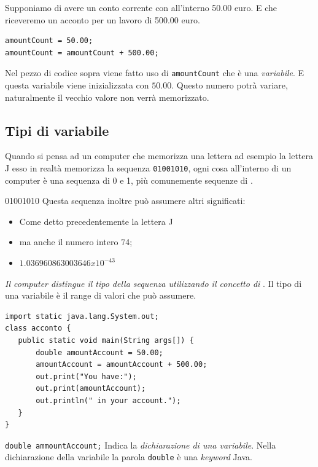 \begin{frame}[fragile]
\begin{block}{}
Supponiamo di avere un conto corrente con all'interno 50.00 euro. E che riceveremo un acconto per un lavoro di 500.00 euro.
\end{block}
\pause
\begin{lstlisting}
amountCount = 50.00;
amountCount = amountCount + 500.00;
\end{lstlisting}
\begin{block}{}
Nel pezzo di codice sopra viene fatto uso di \texttt{amountCount} che è una \textit{variabile}. E questa variabile viene
inizializzata con $50.00$. Questo numero potrà variare, naturalmente il vecchio valore non verrà memorizzato.
\end{block}
\end{frame}

\subsection*{Tipi di variabile}
\begin{frame}
\begin{block}{}
Quando si pensa ad un computer che memorizza una lettera ad esempio la lettera J esso in realtà memorizza la sequenza 
\texttt{01001010}, ogni cosa all'interno di un computer è una sequenza di 0 e 1, più comunemente sequenze di .
\end{block}
\begin{block}{01001010}
Questa sequenza inoltre può assumere altri significati:
\begin{itemize}
\item Come detto precedentemente la lettera J
\item ma anche il numero intero 74;
\item $1.036960863003646 x 10^{-43}$
\end{itemize}
\end{block}
\begin{block}{}
\textit{Il computer distingue il tipo della sequenza utilizzando il concetto di }. Il tipo di una variabile è
il range di valori che può assumere.
\end{block}
\end{frame}

\begin{frame}[fragile]
\begin{lstlisting}
import static java.lang.System.out;
class acconto {
   public static void main(String args[]) {
       double amountAccount = 50.00;
       amountAccount = amountAccount + 500.00;
       out.print("You have:");
       out.print(amountAccount);
       out.println(" in your account.");
   }	
}
\end{lstlisting}
\begin{block}{}
\texttt{double ammountAccount;}
Indica la \textit{dichiarazione di una variabile}. Nella dichiarazione della variabile la parola \texttt{double} è 
una \textit{keyword} Java.
\end{block}
\end{frame}

